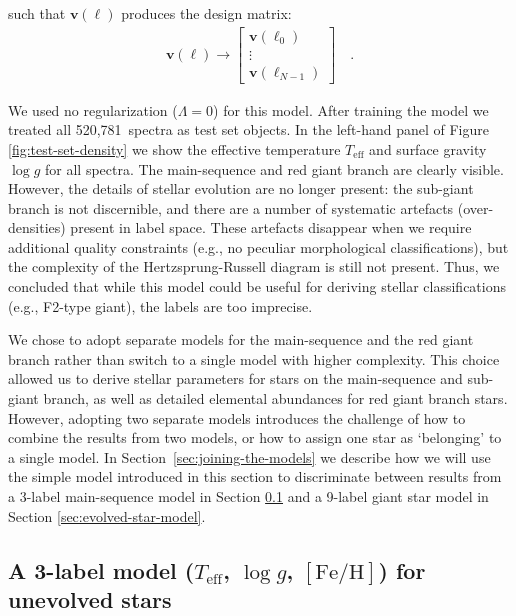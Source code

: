 \documentclass[preprint]{aastex61}
\newcommand{\teff}{T_{\mathrm{eff}}}
\newcommand{\logg}{\log g}
\newcommand{\feh}{[\mathrm{Fe/H}]}
\newcommand{\Nspectra}{520,781}
\newcommand{\Dvector}[1]{\boldsymbol{#1}}
\newcommand{\vecv}{\Dvector{v}}
\begin{document}
\noindent{}such that $\vecv(\ell)$ produces the design matrix:
\begin{eqnarray}
	\vecv(\ell) \rightarrow \begin{bmatrix} \vecv(\ell_0) \\ \vdots \\ \vecv(\ell_{N-1}) \end{bmatrix} \quad .
\end{eqnarray}


We used no regularization ($\Lambda = 0$) for this model.  After training the model we
treated all \Nspectra\ spectra as test set objects.  In the left-hand panel of Figure 
\ref{fig:test-set-density} we show the effective temperature $\teff$ and surface gravity 
$\logg$ for all spectra.  The main-sequence and red giant branch are clearly visible.  
However, the details of stellar evolution are no longer present: the sub-giant branch is 
not discernible, and there are a number of systematic artefacts (over-densities) present
in label space.  These artefacts disappear when we require additional quality constraints 
(e.g., no peculiar morphological classifications), but the complexity of the 
Hertzsprung-Russell diagram is still not present.  Thus, we concluded that while this 
model could be useful for deriving stellar classifications (e.g., F2-type giant), the 
labels are too imprecise.


We chose to adopt separate models for the main-sequence and the red giant branch rather
than switch to a single model with higher complexity.  This choice allowed us to derive
stellar parameters for stars on the main-sequence and sub-giant branch, as well as 
detailed elemental abundances for red giant branch stars.  However, adopting two separate
models introduces the challenge of how to combine the results from two models, or how to
assign one star as `belonging' to a single model.  In Section~\ref{sec:joining-the-models}
we describe how we will use the simple model introduced in this section to discriminate
between results from a 3-label main-sequence model in Section \ref{sec:unevolved-star-model} 
and a 9-label giant star model in Section \ref{sec:evolved-star-model}.


\subsection{A 3-label model ($\teff$, $\logg$, $\feh$) for unevolved stars}
\label{sec:unevolved-star-model}
\end{document}
